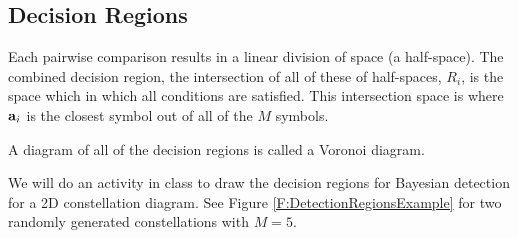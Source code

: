 


\subsection{Decision Regions}
Each pairwise comparison results in a linear division of space (a half-space).  The
combined decision region, the intersection of all of these of half-spaces, $R_i$, is the space which in which all conditions are satisfied.  This intersection space is where $\mathbf{a}_i$ is the closest symbol out of all of the $M$ symbols.

A diagram of all of the decision regions is called a Voronoi diagram.


We will do an activity in class to draw the decision regions for Bayesian detection for a 2D constellation diagram.  See Figure \ref{F:DetectionRegionsExample} for two randomly generated constellations with $M=5$.

